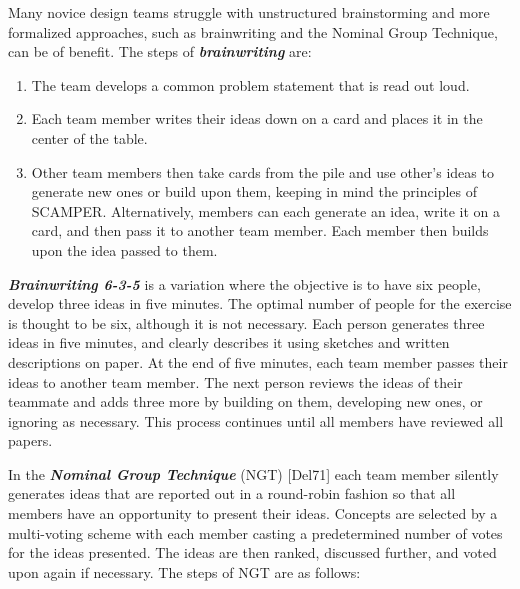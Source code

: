 Many novice design teams struggle with unstructured brainstorming and
more formalized approaches, such as brainwriting and the Nominal Group
Technique, can be of benefit. The steps of \emph{\textbf{brainwriting}}
are:

\begin{enumerate}
\def\labelenumi{\arabic{enumi}.}
\item
  The team develops a common problem statement that is read out loud.
\item
  Each team member writes their ideas down on a card and places it in
  the center of the table.
\item
  Other team members then take cards from the pile and use other's ideas
  to generate new ones or build upon them, keeping in mind the
  principles of SCAMPER. Alternatively, members can each generate an
  idea, write it on a card, and then pass it to another team member.
  Each member then builds upon the idea passed to them.
\end{enumerate}

\emph{\textbf{Brainwriting 6-3-5}} is a variation where the objective is
to have six people, develop three ideas in five minutes. The optimal
number of people for the exercise is thought to be six, although it is
not necessary. Each person generates three ideas in five minutes, and
clearly describes it using sketches and written descriptions on paper.
At the end of five minutes, each team member passes their ideas to
another team member. The next person reviews the ideas of their teammate
and adds three more by building on them, developing new ones, or
ignoring as necessary. This process continues until all members have
reviewed all papers.

In the \emph{\textbf{Nominal Group Technique}} (NGT) {[}Del71{]} each
team member silently generates ideas that are reported out in a
round-robin fashion so that all members have an opportunity to present
their ideas. Concepts are selected by a multi-voting scheme with each
member casting a predetermined number of votes for the ideas presented.
The ideas are then ranked, discussed further, and voted upon again if
necessary. The steps of NGT are as follows:


